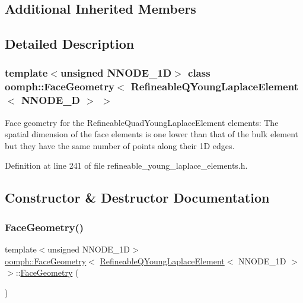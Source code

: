 \subsection*{Additional Inherited Members}


\subsection{Detailed Description}
\subsubsection*{template$<$unsigned N\+N\+O\+D\+E\+\_\+1D$>$\newline
class oomph\+::\+Face\+Geometry$<$ Refineable\+Q\+Young\+Laplace\+Element$<$ N\+N\+O\+D\+E\+\_\+D $>$ $>$}

Face geometry for the Refineable\+Quad\+Young\+Laplace\+Element elements\+: The spatial dimension of the face elements is one lower than that of the bulk element but they have the same number of points along their 1D edges. 

Definition at line 241 of file refineable\+\_\+young\+\_\+laplace\+\_\+elements.\+h.



\subsection{Constructor \& Destructor Documentation}
\mbox{\label{classoomph_1_1FaceGeometry_3_01RefineableQYoungLaplaceElement_3_01NNODE__1D_01_4_01_4_a8f988cb5e431e02b680aba47cd96c9cb}} 
\subsubsection{\texorpdfstring{Face\+Geometry()}{FaceGeometry()}}
{\footnotesize\ttfamily template$<$unsigned N\+N\+O\+D\+E\+\_\+1D$>$ \\
\hyperlink{classoomph_1_1FaceGeometry}{oomph\+::\+Face\+Geometry}$<$ \hyperlink{classoomph_1_1RefineableQYoungLaplaceElement}{Refineable\+Q\+Young\+Laplace\+Element}$<$ N\+N\+O\+D\+E\+\_\+1D $>$ $>$\+::\hyperlink{classoomph_1_1FaceGeometry}{Face\+Geometry} (\begin{DoxyParamCaption}{ }\end{DoxyParamCaption})\hspace{0.3cm}{\ttfamily [inline]}}



